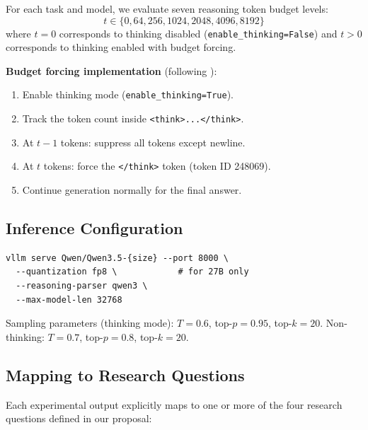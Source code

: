 \documentclass[11pt]{article}
\begin{document}
For each task and model, we evaluate seven reasoning token budget levels:
\begin{equation}
    t \in \{0, 64, 256, 1024, 2048, 4096, 8192\}
\end{equation}
where $t = 0$ corresponds to thinking disabled (\texttt{enable\_thinking=False}) and $t > 0$ corresponds to thinking enabled with budget forcing.

\textbf{Budget forcing implementation} (following \citealt{muennighoff2025s1}):
\begin{enumerate}[nosep]
    \item Enable thinking mode (\texttt{enable\_thinking=True}).
    \item Track the token count inside \texttt{<think>...</think>}.
    \item At $t - 1$ tokens: suppress all tokens except newline.
    \item At $t$ tokens: force the \texttt{</think>} token (token ID 248069).
    \item Continue generation normally for the final answer.
\end{enumerate}

\subsection{Inference Configuration}

\begin{lstlisting}
vllm serve Qwen/Qwen3.5-{size} --port 8000 \
  --quantization fp8 \            # for 27B only
  --reasoning-parser qwen3 \
  --max-model-len 32768
\end{lstlisting}

Sampling parameters (thinking mode): $T = 0.6$, top-$p = 0.95$, top-$k = 20$. Non-thinking: $T = 0.7$, top-$p = 0.8$, top-$k = 20$.

\subsection{Mapping to Research Questions}

Each experimental output explicitly maps to one or more of the four research questions defined in our proposal:
\end{document}
